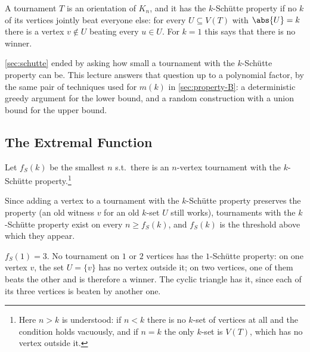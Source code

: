 
\begin{recall}
    A tournament \(T\) is an orientation of \(K_n\), and it has the \(k\)-Sch\"utte property if no \(k\) of its vertices jointly beat everyone else: for every \(U \subseteq V(T)\) with \(\abs{U} = k\) there is a vertex \(v \notin U\) beating every \(u \in U\). For \(k = 1\) this says that there is no winner.
\end{recall}

\autoref{sec:schutte} ended by asking how small a tournament with the \(k\)-Sch\"utte property can be. This lecture answers that question up to a polynomial factor, by the same pair of techniques used for \(m(k)\) in \autoref{sec:property-B}: a deterministic greedy argument for the lower bound, and a random construction with a union bound for the upper bound.

\subsection{The Extremal Function}

\begin{definition}\label{def:f-schutte}
    Let \(f_S(k)\) be the smallest \(n\) s.t.\ there is an \(n\)-vertex tournament with the \(k\)-Sch\"utte property.\footnote{Here \(n > k\) is understood: if \(n < k\) there is no \(k\)-set of vertices at all and the condition holds vacuously, and if \(n = k\) the only \(k\)-set is \(V(T)\), which has no vertex outside it.}
\end{definition}

Since adding a vertex to a tournament with the \(k\)-Sch\"utte property preserves the property (an old witness \(v\) for an old \(k\)-set \(U\) still works), tournaments with the \(k\)-Sch\"utte property exist on every \(n \ge f_S(k)\), and \(f_S(k)\) is the threshold above which they appear.

\begin{eg}\label{eg:fs-one}
    \(f_S(1) = 3\). No tournament on \(1\) or \(2\) vertices has the \(1\)-Sch\"utte property: on one vertex \(v\), the set \(U = \{v\}\) has no vertex outside it; on two vertices, one of them beats the other and is therefore a winner. The cyclic triangle has it, since each of its three vertices is beaten by another one.
    \begin{center}
    \end{center}
\end{eg}

